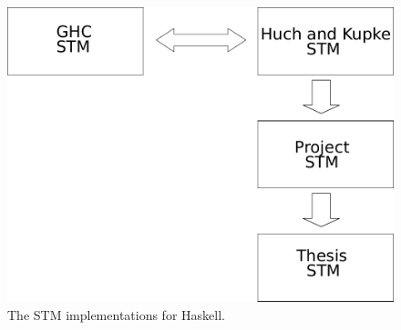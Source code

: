 \begin{figure}
\centering
\includegraphics[scale=0.8]{Figures/implementations}
\decoRule
\caption[Implementations]{The STM implementations for Haskell.}
\label{fig:implementations}
\end{figure}

